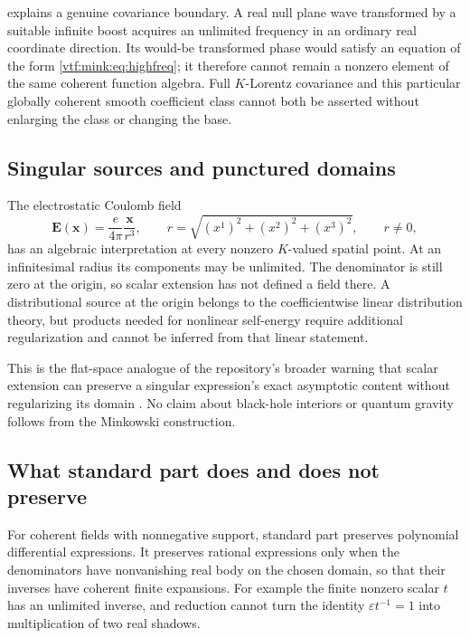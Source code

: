 \documentclass[11pt,letterpaper]{article}
\theoremstyle{definition}
\theoremstyle{remark}
\newcommand{\eps}{\varepsilon}
\begin{document}
 explains a genuine covariance boundary. A real null plane wave transformed by a suitable infinite boost acquires an unlimited frequency in an ordinary real coordinate direction. Its would-be transformed phase would satisfy an equation of the form \cref{vtf:mink:eq:highfreq}; it therefore cannot remain a nonzero element of the same coherent function algebra. Full $K$-Lorentz covariance and this particular globally coherent smooth coefficient class cannot both be asserted without enlarging the class or changing the base.

\subsection{Singular sources and punctured domains}
The electrostatic Coulomb field
\begin{equation}
 \mathbf E(\mathbf x)=\frac{e}{4\pi}\frac{\mathbf x}{r^3},
 \qquad r=\sqrt{(x^1)^2+(x^2)^2+(x^3)^2},
 \qquad r\ne0,
\end{equation}
has an algebraic interpretation at every nonzero $K$-valued spatial point. At an infinitesimal radius its components may be unlimited. The denominator is still zero at the origin, so scalar extension has not defined a field there. A distributional source at the origin belongs to the coefficientwise linear distribution theory, but products needed for nonlinear self-energy require additional regularization and cannot be inferred from that linear statement.

This is the flat-space analogue of the repository's broader warning that scalar extension can preserve a singular expression's exact asymptotic content without regularizing its domain \cite{RepoPhysics}. No claim about black-hole interiors or quantum gravity follows from the Minkowski construction.

\subsection{What standard part does and does not preserve}
For coherent fields with nonnegative support, standard part preserves polynomial differential expressions. It preserves rational expressions only when the denominators have nonvanishing real body on the chosen domain, so that their inverses have coherent finite expansions. For example the finite nonzero scalar $t$ has an unlimited inverse, and reduction cannot turn the identity $\eps t^{-1}=1$ into multiplication of two real shadows.
\end{document}
